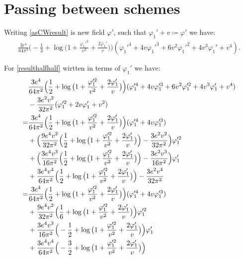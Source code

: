 \section{Passing between schemes}
Writing \ref{asCWresult} is new field $\varphi'$, such that $\varphi_1' + v \coloneqq \varphi'$
we have:
\begin{align}
\frac{3e^4}{64\pi^2}\Big(-\frac{1}{2}+\log\big(1+\frac{\varphi_1'^2}{v^2}+\frac{2\varphi_1'}{v}
\big)\Big)
(\varphi_1'^4 + 4v\varphi_1'^3+6v^2\varphi_1'^2+4v^3\varphi_1'+v^4).
\end{align}

For \ref{resulthalfhalf} wirtten in terms of $\varphi_1'$ we have:
\begin{align}
&\frac{3e^4}{64\pi^2}\Big(\frac{1}{2}+\log\big(1+\frac{\varphi_1'^2}{v^2}+\frac{2\varphi_1'}{v}\big)
\Big)(\varphi_1'^4 + 4v\varphi_1'^3+6v^2\varphi_1'^2+4v^3\varphi_1'+v^4) \notag\\
&-\frac{3e^2v^2}{32\pi^2}(\varphi_1'^2+2v\varphi_1'+v^2) \\
= &\frac{3e^4}{64\pi^2}\Big(\frac{1}{2}+\log\big(1+\frac{\varphi_1'^2}{v^2}+
\frac{2\varphi_1'}{v}\big)
\Big)(\varphi_1'^4 + 4v\varphi_1'^3) \\
&+\Big(\frac{9e^4v^2}{32\pi^2}\Big(\frac{1}{2}+\log\big(1+\frac{\varphi_1'^2}{v^2}+
\frac{2\varphi_1'}{v}\big)\Big)-\frac{3e^2v^2}{32\pi^2}\Big)\varphi_1'^2 \notag\\
&+\Big(\frac{3e^4v^3}{16\pi^2}\Big(\frac{1}{2}+\log\big(1+\frac{\varphi_1'^2}{v^2}+
\frac{2\varphi_1'}{v}\big)\Big)-\frac{3e^2v^3}{16\pi^2}\Big)\varphi_1' \notag\\
&+\frac{3e^4v^4}{64\pi^2}\Big(\frac{1}{2}+\log\big(1+\frac{\varphi_1'^2}{v^2}+
\frac{2\varphi_1'}{v}\big)\Big)-\frac{3e^2v^4}{32\pi^2} \\
= &\frac{3e^4}{64\pi^2}\Big(\frac{1}{2}+\log\big(1+\frac{\varphi_1'^2}{v^2}+
\frac{2\varphi_1'}{v}\big)
\Big)(\varphi_1'^4 + 4v\varphi_1'^3) \\
&+\frac{9e^4v^2}{32\pi^2}\Big(\frac{1}{6}+\log\big(1+\frac{\varphi_1'^2}{v^2}+
\frac{2\varphi_1'}{v}\big)\Big)\varphi_1'^2 \notag\\
&+\frac{3e^4v^3}{16\pi^2}\Big(-\frac{1}{2}+\log\big(1+\frac{\varphi_1'^2}{v^2}+
\frac{2\varphi_1'}{v}\big)\Big)\varphi_1' \notag\\
&+\frac{3e^4v^4}{64\pi^2}\Big(-\frac{3}{2}+\log\big(1+\frac{\varphi_1'^2}{v^2}+
\frac{2\varphi_1'}{v}\big)\Big)
\end{align}

